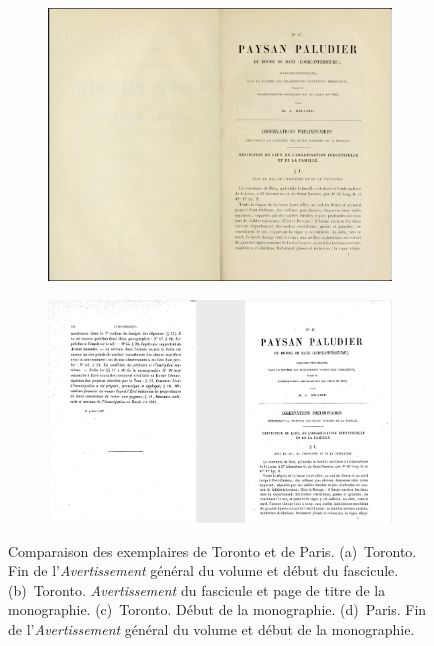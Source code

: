 \begin{figure}[t]
    
    
    \begin{subfigure}[t]{0.4\textwidth}
     \includegraphics[width=1\linewidth]{img/odm47_ia_3.png}
     \caption{}
     \label{odm47ia3}
    \end{subfigure}
    \hspace{5pt}
    \begin{subfigure}[t]{0.4\textwidth}
     \includegraphics[width=1\linewidth]{img/odm47_bnf_1.png}
     \caption{}
     \label{odm47bnf}
    \end{subfigure}
    \caption{Comparaison des exemplaires de Toronto et de Paris. (a)~Toronto. Fin de l'\textit{Avertissement} général du volume et début du fascicule. (b)~Toronto. \textit{Avertissement} du fascicule et page de titre de la monographie. (c)~Toronto. Début de la monographie. (d)~Paris. Fin de l'\textit{Avertissement} général du volume et début de la monographie.}
    \label{odm47}
\end{figure}


